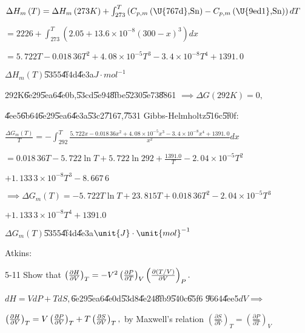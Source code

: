 \documentclass{article}
\begin{document}
$\Delta H_{m}\left( T\right) =\Delta H_{m}\left( 273K\right)
+\int_{273}^{T}\left( C_{p,m}\left( \text{\U{767d},Sn}\right) -C_{p,m}\left( 
\text{\U{9ed1},Sn}\right) \right) dT$

$=2226+\int_{273}^{T}\left( 2.05+13.6\times 10^{-8}\left( 300-x\right)
^{3}\right) dx$

$=\allowbreak 5.\,\allowbreak 722T-0.018\,36T^{2}+4.\,\allowbreak 08\times
10^{-5}T^{3}-3.\,\allowbreak 4\times 10^{-8}\allowbreak
T^{4}+1391.\,\allowbreak 0$

\bigskip $\Delta H_{m}\left( T\right) $\U{5355}\U{4f4d}\U{4e3a}$\unit{J}%
\cdot \unit{mol}^{-1}$

292K\U{6e29}\U{5ea6}\U{4e0b},\U{53cd}\U{5e94}\U{8fbe}\U{5230}\U{5e73}\U{8861}%
$\implies \Delta G\left( 292K\right) =0,$

\U{4ee5}\U{6b64}\U{6e29}\U{5ea6}\U{4e3a}\U{53c2}\U{7167},\U{7531}%
Gibbs-Helmholtz\U{516c}\U{5f0f}:

$\frac{\Delta G_{m}\left( T\right) }{T}=-\int_{292}^{T}\frac{5.\,\allowbreak
722x-0.018\,36x^{2}+4.\,\allowbreak 08\times 10^{-5}x^{3}-3.\,\allowbreak
4\times 10^{-8}\allowbreak x^{4}+1391.\,\allowbreak 0}{x^{2}}dx$

$=\allowbreak 0.018\,36T-5.\,\allowbreak 722\ln T+5.\,\allowbreak 722\ln
292+\allowbreak \frac{1391.0}{T}-2.\,\allowbreak 04\times 10^{-5}T^{2}$

$+1.\,\allowbreak 133\,3\times 10^{-8}\allowbreak T^{3}-8.\,\allowbreak
667\,6$

$\implies \Delta G_{m}\left( T\right) =-5.\,\allowbreak 722\allowbreak T\ln
T+\allowbreak 23.\,\allowbreak 815T+0.018\,36T^{2}-2.\,\allowbreak 04\times
10^{-5}T^{3}$

$+1.\,\allowbreak 133\,3\times 10^{-8}T^{4}+\allowbreak 1391.0$

$\Delta G_{m}\left( T\right) $\U{5355}\U{4f4d}\U{4e3a}$\unit{J}\cdot \unit{%
mol}^{-1}$

Atkins:

5-11 Show that $\left( \frac{\partial H}{\partial V}\right)
_{T}=-V^{2}\left( \frac{\partial P}{\partial T}\right) _{V}\left( \frac{%
\partial \left( T/V\right) }{\partial V}\right) _{P}.$

$dH=VdP+TdS,$\U{6e29}\U{5ea6}\U{4e0d}\U{53d8}\U{4e24}\U{8fb9}\U{540c}\U{65f6}%
\U{9664}\U{4ee5}$dV\implies $

$\left( \frac{\partial H}{\partial V}\right) _{T}=V\left( \frac{\partial P}{%
\partial V}\right) _{T}+T\left( \frac{\partial S}{\partial V}\right) _{T},$%
by Maxwell's relation $\left( \frac{\partial S}{\partial V}\right)
_{T}=\left( \frac{\partial P}{\partial T}\right) _{V}$
\end{document}
